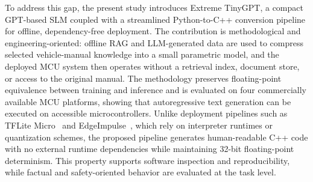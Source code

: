 \documentclass{ieeeaccess}
\begin{document}
To address this gap, the present study introduces Extreme TinyGPT, a compact GPT-based SLM coupled with a streamlined Python-to-C++ conversion pipeline for offline, dependency-free deployment. The contribution is methodological and engineering-oriented: offline RAG and LLM-generated data are used to compress selected vehicle-manual knowledge into a small parametric model, and the deployed MCU system then operates without a retrieval index, document store, or access to the original manual. The methodology preserves floating-point equivalence between training and inference and is evaluated on four commercially available MCU platforms, showing that autoregressive text generation can be executed on accessible microcontrollers. Unlike deployment pipelines such as TFLite Micro~\cite{https://doi.org/10.1002/er.7713} and EdgeImpulse~\cite{s22145174}, which rely on interpreter runtimes or quantization schemes, the proposed pipeline generates human-readable C++ code with no external runtime dependencies while maintaining 32-bit floating-point determinism. This property supports software inspection and reproducibility, while factual and safety-oriented behavior are evaluated at the task level.
\end{document}
